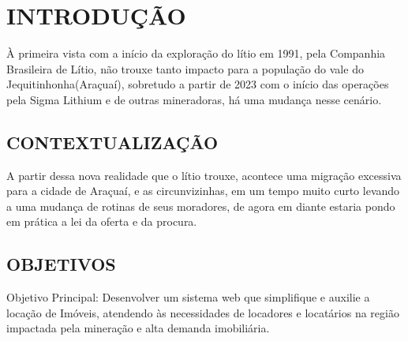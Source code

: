 \chapter{INTRODUÇÃO}


À primeira vista com a início da exploração do lítio em 1991, pela Companhia Brasileira de Lítio, não trouxe tanto impacto para a população do vale do Jequitinhonha(Araçuaí), sobretudo a partir de 2023 com o início das operações pela Sigma Lithium e de outras mineradoras, há uma mudança nesse cenário. \cite{preocupacao-exploracao-litio}




\section{CONTEXTUALIZAÇÃO}


 A partir dessa nova realidade que o lítio trouxe, acontece uma migração excessiva para a cidade de Araçuaí, e as circunvizinhas, em um tempo muito curto levando a uma mudança de rotinas de seus moradores, de agora em diante estaria pondo em prática a lei da oferta e da procura. 

\section{OBJETIVOS}

Objetivo Principal: Desenvolver um sistema web que simplifique e auxilie a locação de Imóveis, atendendo às necessidades de locadores e locatários na região impactada pela mineração e alta demanda imobiliária.



